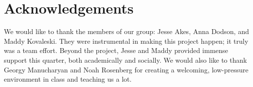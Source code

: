\documentclass{article}
\begin{document}
\section{Acknowledgements}

We would like to thank the members of our group: Jesse Akes, Anna Dodson, and
Maddy Kovaleski. They were instrumental in making this project happen; it truly
was a team effort. Beyond the project, Jesse and Maddy provided immense support
this quarter, both academically and socially. We would also like to thank Georgy
Manucharyan and Noah Rosenberg for creating a welcoming, low-pressure
environment in class and teaching us a lot.  

\newpage
{}

\end{document}
